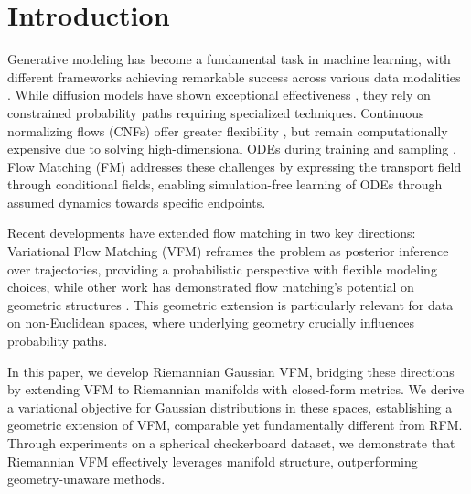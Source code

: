 \section{Introduction}\label{sec:introduction}

Generative modeling has become a fundamental task in machine learning, with different frameworks achieving remarkable success across various data modalities \citep{ramesh2022hierarchical, rombach2022high}. While diffusion models have shown exceptional effectiveness \citep{ho2020denoising, song2020score}, they rely on constrained probability paths requiring specialized techniques. Continuous normalizing flows (CNFs) \citep{chen2018neural} offer greater flexibility \citep{song2021maximum}, but remain computationally expensive due to solving high-dimensional ODEs during training and sampling \citep{ben2022matching, rozen2021moser, grathwohl2018scalable}. Flow Matching (FM) \citep{lipman2023flow} addresses these challenges by expressing the transport field through conditional fields, enabling simulation-free learning of ODEs through assumed dynamics towards specific endpoints.

Recent developments have extended flow matching in two key directions: Variational Flow Matching (VFM) \citep{eijkelboom2024variational} reframes the problem as posterior inference over trajectories, providing a probabilistic perspective with flexible modeling choices, while other work has demonstrated flow matching's potential on geometric structures \citep{chen2024flow}. This geometric extension is particularly relevant for data on non-Euclidean spaces, where underlying geometry crucially influences probability paths.

In this paper, we develop Riemannian Gaussian VFM, bridging these directions by extending VFM to Riemannian manifolds with closed-form metrics. We derive a variational objective for Gaussian distributions in these spaces, establishing a geometric extension of VFM, comparable yet fundamentally different from RFM.
Through experiments on a spherical checkerboard dataset, we demonstrate that Riemannian VFM effectively leverages manifold structure, outperforming geometry-unaware methods. 